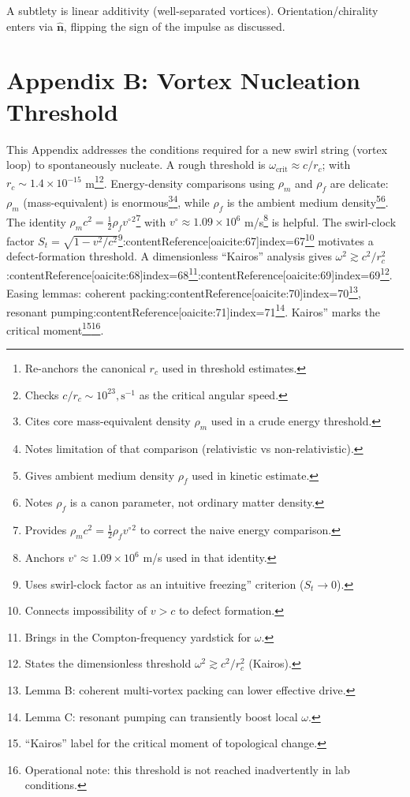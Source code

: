 \documentclass[12pt]{article}
\begin{document}
A subtlety is linear additivity (well-separated vortices). Orientation/chirality enters via $\hat{\mathbf n}$, flipping the sign of the impulse as discussed.




\section*{Appendix B: Vortex Nucleation Threshold}\label{app:Threshold}

This Appendix addresses the conditions required for a new swirl string (vortex loop) to spontaneously nucleate. A rough threshold is $\omega_{\text{crit}}\approx c/r_c$; with $r_c \sim 1.4\times10^{-15}$ m\footnote{Re-anchors the canonical $r_c$ used in threshold estimates.}\footnote{Checks $c/r_c\sim10^{23},\mathrm{s^{-1}}$ as the critical angular speed.}. Energy-density comparisons using $\rho_m$ and $\rho_f$ are delicate: $\rho_m$ (mass-equivalent) is enormous\footnote{Cites core mass-equivalent density $\rho_m$ used in a crude energy threshold.}\footnote{Notes limitation of that comparison (relativistic vs non-relativistic).}, while $\rho_f$ is the ambient medium density\footnote{Gives ambient medium density $\rho_f$ used in kinetic estimate.}\footnote{Notes $\rho_f$ is a canon parameter, not ordinary matter density.}. The identity $\rho_m c^2=\tfrac12\rho_f {v^\circ}^2$\footnote{Provides $\rho_m c^2=\frac12\rho_f {v^\circ}^2$ to correct the naive energy comparison.} with $v^\circ\approx1.09\times10^6$ m/s\footnote{Anchors $v^\circ\approx 1.09\times10^6$ m/s used in that identity.} is helpful. The swirl-clock factor $S_t=\sqrt{1-v^2/c^2}$\footnote{Uses swirl-clock factor as an intuitive freezing'' criterion ($S_t\to 0$).}:contentReference[oaicite:67]{index=67}\footnote{Connects impossibility of $v>c$ to defect formation.} motivates a defect-formation threshold. A dimensionless “Kairos” analysis gives $\omega^2\gtrsim c^2/r_c^2$:contentReference[oaicite:68]{index=68}\footnote{Brings in the Compton-frequency yardstick for $\omega$.}:contentReference[oaicite:69]{index=69}\footnote{States the dimensionless threshold $\omega^2\gtrsim c^2/r_c^2$ (Kairos).}. Easing lemmas: coherent packing:contentReference[oaicite:70]{index=70}\footnote{Lemma B: coherent multi-vortex packing can lower effective drive.}, resonant pumping:contentReference[oaicite:71]{index=71}\footnote{Lemma C: resonant pumping can transiently boost local $\omega$.}. Kairos'' marks the critical moment\footnote{``Kairos'' label for the critical moment of topological change.}\footnote{Operational note: this threshold is not reached inadvertently in lab conditions.}.
\end{document}
